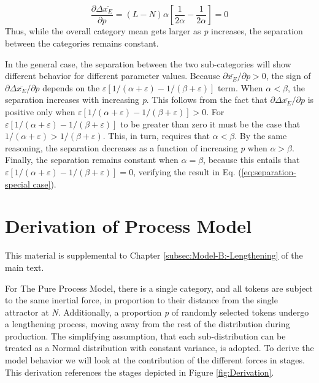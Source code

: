 \begin{equation}
\frac{\partial\Delta\overline{x_{E}}}{\partial p}=(L-N)\alpha\left[\frac{1}{2\alpha}-\frac{1}{2\alpha}\right]=0\label{eq:separation-special case}
\end{equation}
Thus, while the overall category mean gets larger as \emph{p} increases,
the separation between the categories remains constant. 

In the general case, the separation between the two sub-categories
will show different behavior for different parameter values. Because
${\partial\overline{x_{E}}}/{\partial p}>0$, the sign of ${\partial\Delta\overline{x_{E}}}/{\partial p}$
depends on the $\varepsilon[{1}/({\alpha+\varepsilon})-{1}/({\beta+\varepsilon})]$
term. When $\alpha<\beta$, the separation increases with increasing
\emph{p}. This follows from the fact that ${\partial\Delta\overline{x_{E}}}/{\partial p}$
is positive only when $\varepsilon[{1}/({\alpha+\varepsilon})-{1}/({\beta+\varepsilon})]>0$.
For $\varepsilon[{1}/({\alpha+\varepsilon})-{1}/({\beta+\varepsilon})]$
to be greater than zero it must be the case that ${1}/({\alpha+\varepsilon})>{1}/({\beta+\varepsilon})$.
This, in turn, requires that $\alpha<\beta$. By the same reasoning,
the separation decreases as a function of increasing \emph{p} when
$\alpha>\beta$. Finally, the separation remains constant when $\alpha=\beta$,
because this entails that $\varepsilon[{1}/({\alpha+\varepsilon})-{1}/({\beta+\varepsilon})]=0$,
verifying the result in Eq. (\ref{eq:separation-special case}).

\chapter{\label{chap:Appendix D}Derivation of Process Model}

This material is supplemental to Chapter \ref{subsec:Model-B:-Lengthening}
of the main text.

For The Pure Process Model, there is a single category, and all tokens
are subject to the same inertial force, in proportion to their distance
from the single attractor at \emph{N}. Additionally, a proportion
\emph{p} of randomly selected tokens undergo a lengthening process,
moving away from the rest of the distribution during production. The
simplifying assumption, that each sub-distribution can be treated
as a Normal distribution with constant variance, is adopted. To derive
the model behavior we will look at the contribution of the different
forces in stages. This derivation references the stages depicted in
Figure \ref{fig:Derivation}.

